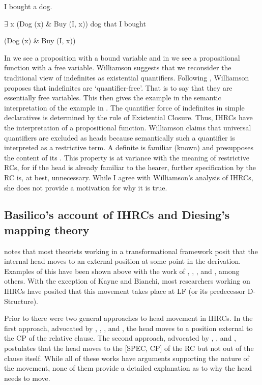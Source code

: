 \documentclass[output=paper]{LSP/langsci}
\begin{document}
\ea I bought a dog.	\label{boyle40}

$\exists$ x (Dog (x) \& Buy (I, x))
\ex dog that I bought \label{boyle41}

(Dog (x) \& Buy (I, x))
\z	
	
In  we see a proposition with a bound variable and in  we see a propositional function with a free variable. Williamson suggests that we reconsider the traditional view of indefinites as existential quantifiers. Following \citet{Heim1982}, Williamson proposes that indefinites are `quantifier-free'. That is to say that they are essentially free variables. This then gives the example in  the semantic interpretation of the example in . The quantifier force of indefinites in simple declaratives is determined by the rule of Existential Closure. Thus, IHRCs have the interpretation of a propositional function. Williamson claims that universal quantifiers are excluded as heads because semantically such a quantifier is interpreted as a restrictive term. A definite is familiar (known) and presupposes the content of its .  This property is at variance with the meaning of restrictive RCs, for if the head is already familiar to the hearer, further specification by the RC is, at best, unnecessary.  While I agree with Williamson's analysis of IHRCs, she does not provide a motivation for why it is true.

\subsection{Basilico's account of IHRCs and Diesing's mapping theory}\label{sec:boyle:6.3}

\citet{Basilico1996} notes that most theorists working in a transformational framework posit that the internal head moves to an external position at some point in the derivation. Examples of this have been shown above with the work of \citet{Cole1982, Cole1987}, \citet{Williamson1987}, \citet{Culy1990}, \citet{Kayne1994} and \citet{Bianchi1999}, among others. With the exception of Kayne and Bianchi, most researchers working on IHRCs have posited that this movement takes place at LF (or its predecessor D-Structure). 

Prior to \citet{Basilico1996} there were two general approaches to head movement in IHRCs. In the first approach, advocated by \citet{Broadwell1985, Broadwell1987}, \citet{Cole1987}, \citet{LefebvreMuysken1988}, and \citet{ColeHermon1994}, the head moves to a position external to the CP of the relative clause. The second approach, advocated by \citet{Williamson1987}, \citet{Brassetal1989}, and \citet{Bonneau1992}, postulates that the head moves to the [SPEC, CP] of the RC but not out of the clause itself. While all of these works have arguments supporting the nature of the movement, none of them provide a detailed explanation as to why the head needs to move.  
\end{document}
